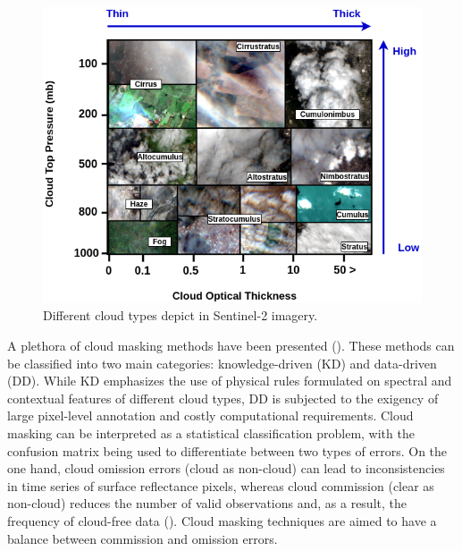 \documentclass[a4paper, nobind]{templates/cdethesis}
\begin{document}
\begin{figure}[!h]
    \centering
    \includegraphics[width=0.98\linewidth]{figures/chapter02/figure01.png}
    \caption{Different cloud types depict in Sentinel-2 imagery.}
    \label{fig:figure013}
\end{figure}

A plethora of cloud masking methods have been presented (\cite{Hagolle2017, Domnich2021, Louis2016, Qiu2019, richter2019atmospheric, jan_wevers_2021_5788067, Lopez-Puigdollers2021, frantz2019force}). These methods can be classified into two main categories: knowledge-driven (KD) and data-driven (DD). While KD emphasizes the use of physical rules formulated on spectral and contextual features of different cloud types, DD is subjected to the exigency of large pixel-level annotation and costly computational requirements. Cloud masking can be interpreted as a statistical classification problem, with the confusion matrix being used to differentiate between two types of errors. On the one hand, cloud omission errors (cloud as non-cloud) can lead to inconsistencies in time series of surface reflectance pixels, whereas cloud commission (clear as non-cloud) reduces the number of valid observations and, as a result, the frequency of cloud-free data (\cite{skakun2022cloud}). Cloud masking techniques are aimed to have a balance between commission and omission errors.
\end{document}

